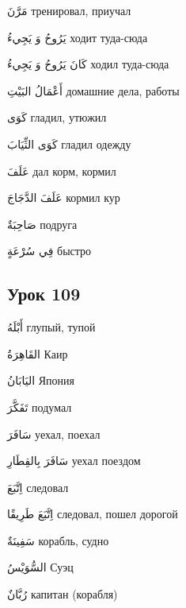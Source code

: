\documentclass[a5paper]{article}
\newcommand\textstyleDropCaps[1]{#1}
\newcommand\textstyleCaptioncharacters[1]{#1}
\begin{document}
\textstyleCaptioncharacters{مَرَّنَ }\textstyleDropCaps{тренировал, приучал‎}

\textstyleCaptioncharacters{يَرُوحُ وَ يَجِيءُ }\textstyleDropCaps{ходит туда-сюда‎}

\textstyleCaptioncharacters{كَانَ يَرُوحُ وَ يَجِيءُ }\textstyleDropCaps{хо­дил туда-сюда ‎}

\textstyleCaptioncharacters{أَعْمَالُ البَيْتِ }\textstyleDropCaps{домаш­ние дела, работы‎}

\textstyleCaptioncharacters{كَوَى }\textstyleDropCaps{гладил, утюжил‎}

\textstyleCaptioncharacters{كَوَى الثِّيَابَ }\textstyleDropCaps{гладил оде­жду‎}

\textstyleCaptioncharacters{عَلَفَ }\textstyleDropCaps{дал корм, кормил‎}

\textstyleCaptioncharacters{عَلَفَ الدَّجَاجَ }\textstyleDropCaps{кормил кур‎}

\textstyleCaptioncharacters{صَاحِبَةٌ }\textstyleDropCaps{подруга‎}

\textstyleCaptioncharacters{فِي سُرْعَةٍ }\textstyleDropCaps{быстро‎}

\subsection[Урок 109‎]{\textstyleDropCaps{Урок 109‎}}
\textstyleCaptioncharacters{أَبْلَهُ }\textstyleDropCaps{глупый, тупой‎}

\textstyleCaptioncharacters{القَاهِرَةُ }\textstyleDropCaps{Каир‎}

\textstyleCaptioncharacters{اليَابَانُ }\textstyleDropCaps{Япония‎}

\textstyleCaptioncharacters{تَفَكَّرَ }\textstyleDropCaps{подумал‎}

\textstyleCaptioncharacters{سَافَرَ }\textstyleDropCaps{уехал, поехал‎}

\textstyleCaptioncharacters{سَافَرَ بِالقِطَارِ }\textstyleDropCaps{уехал поез­дом‎}

\textstyleCaptioncharacters{اِتَّبَعَ }\textstyleDropCaps{следовал‎}

\textstyleCaptioncharacters{اِتَّبَعَ طَرِيقًا }\textstyleDropCaps{следовал, по­шел дорогой‎}

\textstyleCaptioncharacters{سَفِينَةٌ }\textstyleDropCaps{корабль, судно‎}

\textstyleCaptioncharacters{السُّوَيْسُ }\textstyleDropCaps{Суэц‎}

\textstyleCaptioncharacters{رُبَّانٌ }\textstyleDropCaps{капитан (корабля)‎}
\end{document}
